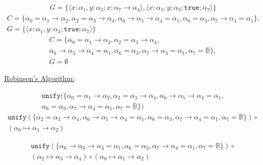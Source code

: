 \documentclass[11pt]{article}
\newcommand{\B}{\mathbb{B}}
\newcommand{\T}{\texttt{true}}
\newcommand{\U}{\texttt{unify}}
\newcommand{\rarr}{\rightarrow}
\begin{document}
\begin{enumerate}
\begin{multline}
		      G = \{  \langle  x: \alpha_1, y:\alpha_3 ; x ; \alpha_7 \rarr \alpha_4  \rangle, \langle x: \alpha_1, y:\alpha_3 ; \T ; \alpha_7 \rangle \}
	      \end{multline}
	      \begin{multline}
		      C = \{ \alpha_0 = \alpha_1 \rarr \alpha_2, \alpha_2 = \alpha_3 \rarr \alpha_4, \alpha_6 \rarr \alpha_5 \rarr \alpha_4 = \alpha_1, \alpha_6 = \alpha_3, \alpha_7 \rarr \alpha_4 = \alpha_1 \},                               \\
		      G = \{ \langle x: \alpha_1, y:\alpha_3 ; \T ; \alpha_7 \rangle \}
	      \end{multline}
	      \begin{multline}
		      C = \{ \alpha_0 = \alpha_1 \rarr \alpha_2, \alpha_2 = \alpha_3 \rarr \alpha_4, \\
		      \alpha_6 \rarr \alpha_5 \rarr \alpha_4 = \alpha_1, \alpha_6 = \alpha_3, \alpha_7 \rarr \alpha_4 = \alpha_1, \alpha_7 = \B \},                \\ 
		      G = \emptyset
	      \end{multline}

	

	\underline{Robinson's Algorithm:}
	
	\begin{multline}
		\U( \{ \alpha_0 = \alpha_1 \rarr \alpha_2, \alpha_2 = \alpha_3 \rarr \alpha_4, \alpha_6 \rarr \alpha_5 \rarr \alpha_4 = \alpha_1, \\ \alpha_6 = \alpha_3, \alpha_7 \rarr \alpha_4 = \alpha_1, \alpha_7 = \B \}) 
	\end{multline}
	\begin{multline}
		\U( \{ \alpha_2 = \alpha_3 \rarr \alpha_4, \alpha_6 \rarr \alpha_5 \rarr \alpha_4 = \alpha_1, \alpha_6 = \alpha_3, \alpha_7 \rarr \alpha_4 = \alpha_1, \alpha_7 = \B \}  ) \circ \\ ( \alpha_0 \mapsto \alpha_1 \rarr \alpha_2 )
	\end{multline}

	\begin{multline}
		\U( \{ \alpha_6 \rarr \alpha_6 \rarr \alpha_4 = \alpha_1, \alpha_6 = \alpha_3, \alpha_7 \rarr \alpha_4 = \alpha_1, \alpha_7 = \B \} )\circ \\ ( \alpha_2 \mapsto \alpha_3 \rarr \alpha_4) \circ ( \alpha_0 \mapsto \alpha_1 \rarr \alpha_2) 
	\end{multline}


\end{enumerate}
\end{document}
